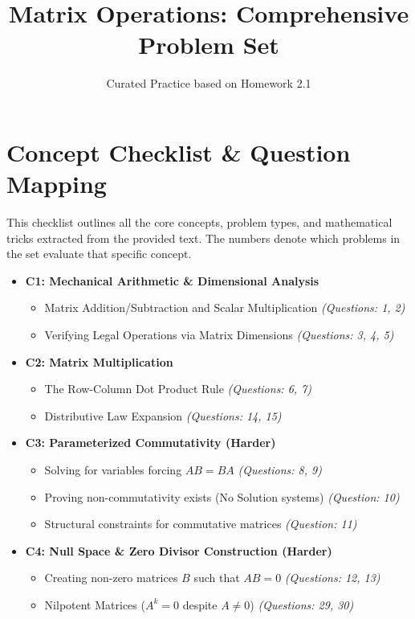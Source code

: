 \documentclass[11pt]{article}
\title{\textbf{Matrix Operations: Comprehensive Problem Set}}
\author{Curated Practice based on Homework 2.1}
\date{}
\begin{document}
\maketitle
\tableofcontents
\newpage

\section{Concept Checklist \& Question Mapping}
This checklist outlines all the core concepts, problem types, and mathematical tricks extracted from the provided text. The numbers denote which problems in the set evaluate that specific concept.

\begin{itemize}
    \item \textbf{C1: Mechanical Arithmetic \& Dimensional Analysis}
    \begin{itemize}
        \item Matrix Addition/Subtraction and Scalar Multiplication \textit{(Questions: 1, 2)}
        \item Verifying Legal Operations via Matrix Dimensions \textit{(Questions: 3, 4, 5)}
    \end{itemize}
    
    \item \textbf{C2: Matrix Multiplication}
    \begin{itemize}
        \item The Row-Column Dot Product Rule \textit{(Questions: 6, 7)}
        \item Distributive Law Expansion \textit{(Questions: 14, 15)}
    \end{itemize}
    
    \item \textbf{C3: Parameterized Commutativity (Harder)}
    \begin{itemize}
        \item Solving for variables forcing $AB = BA$ \textit{(Questions: 8, 9)}
        \item Proving non-commutativity exists (No Solution systems) \textit{(Question: 10)}
        \item Structural constraints for commutative matrices \textit{(Question: 11)}
    \end{itemize}

    \item \textbf{C4: Null Space \& Zero Divisor Construction (Harder)}
    \begin{itemize}
        \item Creating non-zero matrices $B$ such that $AB = 0$ \textit{(Questions: 12, 13)}
        \item Nilpotent Matrices ($A^k = 0$ despite $A \neq 0$) \textit{(Questions: 29, 30)}
    \end{itemize}


\end{itemize}
\end{document}
